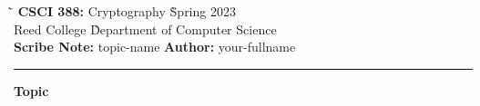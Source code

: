 \documentclass{article}
\begin{document}
\begin{tabbing}
  \`\=\kill
  \textbf{CSCI 388:} Cryptography \` Spring 2023 \\
  Reed College \` Department of Computer Science \\
  \textbf{Scribe Note:} topic-name \` \textbf{Author:} your-fullname
\end{tabbing}


\hrule

\vspace{.25in}

\begin{center}
\textbf{\Large Topic}
\end{center}
\vspace{.2in}
\end{document}
